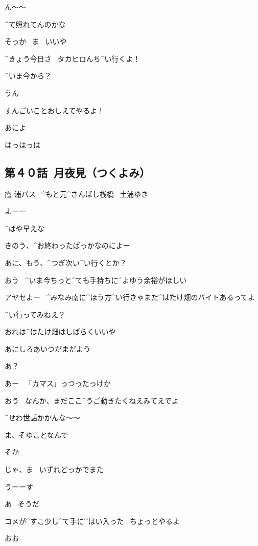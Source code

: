 \Takahiro ん〜〜

\Takahiro ^{て}{照}れてんのかな

\Makki そっか
\ ま
\ いいや

\page[113]
\Makki ^{きょう}{今日}さ
\ タカヒロんち^{い}{行}くよ！

\Takahiro ^{いま}{今}から？

\Makki うん

\Makki すんごいことおしえてやるよ！

\Takahiro あによ

\Makki はっはっは


\subsection{第４０話\ 月夜見（つくよみ）}

\page[116]
\Sign 霞 浦バス
\ ^{もと}{元}^{さんばし}{桟橋}
\ 土浦ゆき

\page[118]
\Person よーー

\Ayase ^{はや}{早}えな

\page[119]
\Person きのう、^{お}{終}わったばっかなのによー

\Ayase あに、もう、^{つぎ}{次}い^{い}{行}くとか？

\Person おう
\ ^{いま}{今}ちっと^{ても}{手持}ちに^{よゆう}{余裕}がほしい

\Person アヤセよー
\ ^{みなみ}{南}に^{ほう}{方}^{い}{行}きゃまた^{はたけ}{畑}のバイトあるってよ

\Person ^{い}{行}ってみねえ？

\Ayase おれは^{はたけ}{畑}はしばらくいいや

\page[120]
\Ayase あにしろあいつがまだよう

\Person あ？

\Person あー
\ 「カマス」っつったっけか

\Ayase おう
\ なんか、まだここ^{うご}{動}きたくねえみてえでよ

\page[121]
\Person ^{せわ}{世話}かかんな〜〜

\Ayase ま、そゆことなんで

\Person そか

\Person じゃ、ま
\ いずれどっかでまた

\Ayase うーーす

\Person あ
\ そうだ

\page[122]
\Person コメが^{すこ}{少}し^{て}{手}に^{はい}{入}った
\ ちょっとやるよ

\Ayase おお

